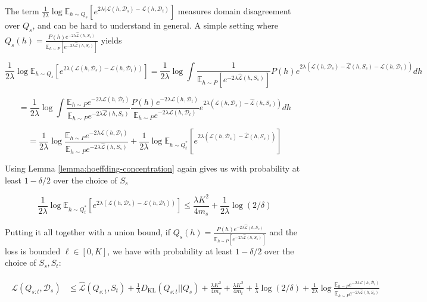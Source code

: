 \documentclass[letterpaper]{article}
\theoremstyle{definition}
\begin{document}
The term $\frac{1}{2\lambda}\log \mathbb{E}_{h\sim Q_{s}}\left [e^{2\lambda(\mathcal{L}(h,\mathcal{D}_s)-\mathcal{L}(h,\mathcal{D}_t)}\right ]$ measures domain disagreement over $Q_s$, and can be hard to understand in general. A simple setting where $Q_s(h)=\frac{P(h)e^{-2\lambda\hat{\mathcal{L}}(h,S_s)}}{\mathbb{E}_{h\sim P}\left [e^{-2\lambda\hat{\mathcal{L}}(h,S_s)} \right ]}$ yields 

$$\frac{1}{2\lambda}\log \mathbb{E}_{h\sim Q_{s}}\left [e^{2\lambda(\mathcal{L}(h,\mathcal{D}_s)-\mathcal{L}(h,\mathcal{D}_t))}\right ]=\frac{1}{2\lambda}\log \int \frac{1}{\mathbb{E}_{h\sim P}\left [e^{-2\lambda\hat{\mathcal{L}}(h,S_s)} \right ]}P(h)e^{2\lambda(\mathcal{L}(h,\mathcal{D}_s)-\hat{\mathcal{L}}(h,S_s)-\mathcal{L}(h,\mathcal{D}_t))}dh$$

$$=\frac{1}{2\lambda}\log \int \frac{\mathbb{E}_{h\sim P} e^{-2\lambda\mathcal{L}(h,\mathcal{D}_t)}}{\mathbb{E}_{h\sim P} e^{-2\lambda\hat{\mathcal{L}}(h,S_s)}  }\frac{P(h)e^{-2\lambda\mathcal{L}(h,\mathcal{D}_t)}}{\mathbb{E}_{h\sim P} e^{-2\lambda\mathcal{L}(h,\mathcal{D}_t)}}e^{2\lambda(\mathcal{L}(h,\mathcal{D}_s)-\hat{\mathcal{L}}(h,S_s))}dh$$

$$=\frac{1}{2\lambda}\log\frac{\mathbb{E}_{h\sim P} e^{-2\lambda\mathcal{L}(h,\mathcal{D}_t)}}{\mathbb{E}_{h\sim P} e^{-2\lambda\hat{\mathcal{L}}(h,S_s)}  }+\frac{1}{2\lambda}\log\mathbb{E}_{h\sim Q^{*}_t}\left [e^{2\lambda(\mathcal{L}(h,\mathcal{D}_s)-\hat{\mathcal{L}}(h,S_s))}\right ]$$

Using Lemma \ref{lemma:hoeffding-concentration} again gives us with probability at least $1-\delta/2$ over the choice of $S_s$

$$\frac{1}{2\lambda}\log \mathbb{E}_{h\sim Q^{*}_t}\left [e^{2\lambda(\mathcal{L}(h,\mathcal{D}_s)-\mathcal{L}(h,\mathcal{D}_t))}\right ] \leq \frac{\lambda K^2}{4m_s}+\frac{1}{2\lambda}\log(2/\delta)$$

Putting it all together with a union bound, if $Q_s(h)=\frac{P(h)e^{-2\lambda\hat{\mathcal{L}}(h,S_s)}}{\mathbb{E}_{h\sim P}\left [e^{-2\lambda\hat{\mathcal{L}}(h,S_s)} \right ]}$ and the loss is bounded $\ell\in[0,K]$, we have with probability at least $1-\delta/2$ over the choice of $S_s,S_t$:

\begin{align}
\begin{split}
\mathcal{L}(Q_{s:t}, \mathcal{D}_s) &\leq \hat{\mathcal{L}}(Q_{s:t}, S_t) + \frac{1}{\lambda} D_{\mathrm{KL}}(Q_{s:t}||Q_{s})
+\frac{\lambda K^2}{4m_s}+\frac{\lambda K^2}{4m_t}+\frac{1}{\lambda}\log(2/\delta)+\frac{1}{2\lambda}\log\frac{\mathbb{E}_{h\sim P} e^{-2\lambda\mathcal{L}(h,\mathcal{D}_t)}}{\mathbb{E}_{h\sim P} e^{-2\lambda\hat{\mathcal{L}}(h,S_s)}  }
\end{split}
\end{align}
\end{document}

